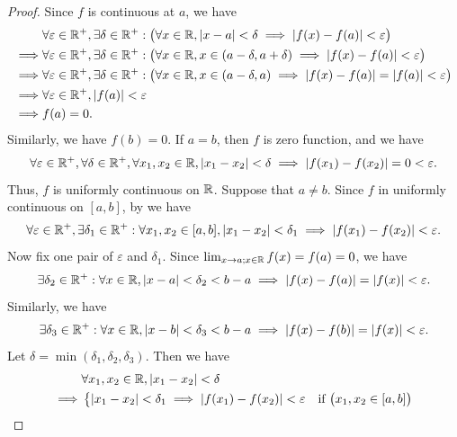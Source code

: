 \begin{proof}
  Since \(f\) is continuous at \(a\), we have
  \begin{align*}
             & \forall \varepsilon \in \mathbb{R}^+, \exists \delta \in \mathbb{R}^+ : \big(\forall x \in \mathbb{R}, \left\lvert x - a\right\rvert < \delta \implies \left\lvert f(x) - f(a)\right\rvert < \varepsilon\big)               \\
    \implies & \forall \varepsilon \in \mathbb{R}^+, \exists \delta \in \mathbb{R}^+ : \big(\forall x \in \mathbb{R}, x \in (a - \delta, a + \delta) \implies \left\lvert f(x) - f(a)\right\rvert < \varepsilon\big)     \\
    \implies & \forall \varepsilon \in \mathbb{R}^+, \exists \delta \in \mathbb{R}^+ : \big(\forall x \in \mathbb{R}, x \in (a - \delta, a) \implies \left\lvert f(x) - f(a)\right\rvert = \left\lvert f(a)\right\rvert < \varepsilon\big) \\
    \implies & \forall \varepsilon \in \mathbb{R}^+, \left\lvert f(a)\right\rvert < \varepsilon                                                                                                          \\
    \implies & f(a) = 0.
  \end{align*}
  Similarly, we have \(f(b) = 0\).
  If \(a = b\), then \(f\) is zero function, and we have
  \[
    \forall \varepsilon \in \mathbb{R}^+, \forall \delta \in \mathbb{R}^+, \forall x_1, x_2 \in \mathbb{R}, \left\lvert x_1 - x_2\right\rvert < \delta \implies \left\lvert f(x_1) - f(x_2)\right\rvert = 0 < \varepsilon.
  \]
  Thus, \(f\) is uniformly continuous on \(\mathbb{R}\).
  Suppose that \(a \neq b\).
  Since \(f\) in uniformly continuous on \([a, b]\), by  we have
  \[
    \forall \varepsilon \in \mathbb{R}^+, \exists \delta_1 \in \mathbb{R}^+ : \forall x_1, x_2 \in [a, b], \left\lvert x_1 - x_2\right\rvert < \delta_1 \implies \left\lvert f(x_1) - f(x_2)\right\rvert < \varepsilon.
  \]
  Now fix one pair of \(\varepsilon\) and \(\delta_1\).
  Since \(\lim_{x \to a ; x \in \mathbb{R}} f(x) = f(a) = 0\), we have
  \[
    \exists \delta_2 \in \mathbb{R}^+ : \forall x \in \mathbb{R}, \left\lvert x - a\right\rvert < \delta_2 < b - a \implies \left\lvert f(x) - f(a)\right\rvert = \left\lvert f(x)\right\rvert < \varepsilon.
  \]
  Similarly, we have
  \[
    \exists \delta_3 \in \mathbb{R}^+ : \forall x \in \mathbb{R}, \left\lvert x - b\right\rvert < \delta_3 < b - a \implies \left\lvert f(x) - f(b)\right\rvert = \left\lvert f(x)\right\rvert < \varepsilon.
  \]
  Let \(\delta = \min(\delta_1, \delta_2, \delta_3)\).
  Then we have
  \begin{align*}
             & \forall x_1, x_2 \in \R, \abs{x_1 - x_2} < \delta                                                                                                            \\
    \implies & \begin{dcases}
                 \abs{x_1 - x_2} < \delta_1 \implies \abs{f(x_1) - f(x_2)} < \varepsilon & \text{if } \big(x_1, x_2 \in [a, b]\big)                                 \\

\end{dcases}
\end{align*}
\end{proof}

